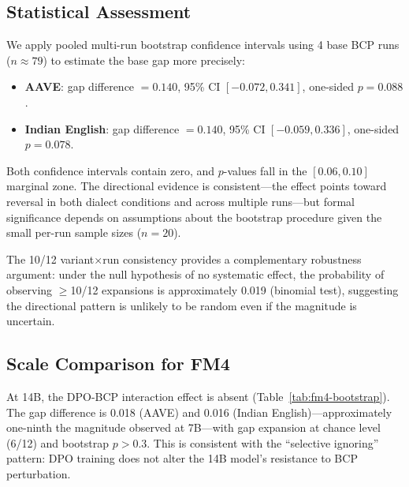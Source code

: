 \documentclass[11pt,a4paper]{article}
\begin{document}
\subsection{Statistical Assessment}

We apply pooled multi-run bootstrap confidence intervals using 4 base BCP runs ($n \approx 79$) to estimate the base gap more precisely:

\begin{itemize}
    \item \textbf{AAVE}: gap difference $= 0.140$, 95\% CI $[-0.072, 0.341]$, one-sided $p = 0.088$.
    \item \textbf{Indian English}: gap difference $= 0.140$, 95\% CI $[-0.059, 0.336]$, one-sided $p = 0.078$.
\end{itemize}

Both confidence intervals contain zero, and $p$-values fall in the $[0.06, 0.10]$ marginal zone. The directional evidence is consistent---the effect points toward reversal in both dialect conditions and across multiple runs---but formal significance depends on assumptions about the bootstrap procedure given the small per-run sample sizes ($n = 20$).

The 10/12 variant$\times$run consistency provides a complementary robustness argument: under the null hypothesis of no systematic effect, the probability of observing $\geq$10/12 expansions is approximately 0.019 (binomial test), suggesting the directional pattern is unlikely to be random even if the magnitude is uncertain.

\subsection{Scale Comparison for FM4}

At 14B, the DPO-BCP interaction effect is absent (Table~\ref{tab:fm4-bootstrap}). The gap difference is 0.018 (AAVE) and 0.016 (Indian English)---approximately one-ninth the magnitude observed at 7B---with gap expansion at chance level (6/12) and bootstrap $p > 0.3$. This is consistent with the ``selective ignoring'' pattern: DPO training does not alter the 14B model's resistance to BCP perturbation.
\end{document}
